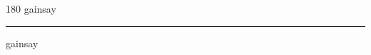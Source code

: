 
\begin{frame}
\begin{center}
\begin{turn}{180}
{\fontsize{2.5cm}{1em}\selectfont gainsay}
\end{turn}
\vspace{1em}\par  
\hrule
\vspace{1em}\par  
{\fontsize{2.5cm}{1em}\selectfont gainsay}
\end{center}
\end{frame}
